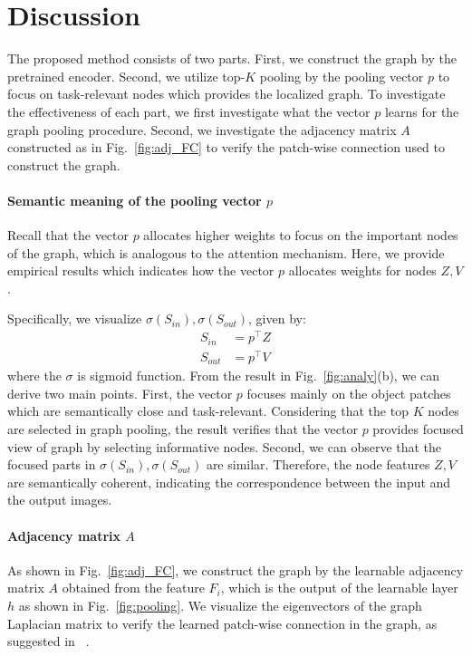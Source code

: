 \documentclass[letterpaper]{article} %
\begin{document}
\section{Discussion}

The proposed method consists of two parts. First, we construct the graph by the pretrained encoder. Second, we utilize top-$K$ pooling by the pooling vector $p$ to focus on task-relevant nodes which provides the localized graph.
To investigate the effectiveness of each part, we first investigate what the vector $p$ learns for the graph pooling procedure.
Second, we investigate the adjacency matrix $A$ constructed as in Fig.~\ref{fig:adj_FC}
to verify the patch-wise connection used to construct the graph.



\paragraph{Semantic meaning of the pooling vector $p$ }
Recall that the vector $p$ allocates higher weights to focus on the important nodes of the graph, which is analogous to the attention mechanism.
Here, we provide empirical results which indicates how the vector $p$ allocates weights for nodes $Z, V$.


Specifically, we visualize $\sigma(S_{in}), \sigma(S_{out})$, given by:
\begin{align}
S_{in} &= p^\top Z \\
S_{out} &= p^\top V
\end{align}
where the $\sigma$ is sigmoid function.
From the result in Fig.~\ref{fig:analy}(b), we can derive two main points.
First, the vector $p$ focuses mainly on the object patches which are semantically close and task-relevant.
Considering that the top $K$ nodes are selected in graph pooling, the result verifies that the vector $p$ provides focused view of graph by selecting informative nodes.
Second, we can observe that the focused parts in $\sigma(S_{in}), \sigma(S_{out})$ are similar. Therefore, the node features $Z, V$ are semantically coherent, indicating the correspondence between the input and the output images.




\paragraph{Adjacency matrix $A$}
As shown in Fig.~\ref{fig:adj_FC},
we construct the graph by the learnable adjacency matrix $A$ obtained from the feature $F_i$, which is the output of the learnable layer $h$ as shown in Fig.~\ref{fig:pooling}. We visualize the eigenvectors of the graph Laplacian matrix to verify the learned patch-wise connection in the graph, as suggested in ~\cite{deepSpectral}.
\end{document}
